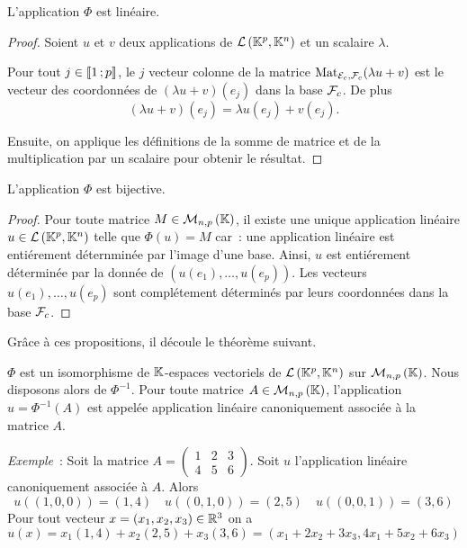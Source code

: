 \begin{prop}
  L'application \(\Phi\) est linéaire.
\end{prop}
\begin{proof}
  Soient \(u\) et \(v\) deux applications de \(\mathcal{L}\left(\mathbb{K}^p,\mathbb{K}^n\right)\) et un scalaire
  \(\lambda\).

  Pour tout \(j \in \mathopen{\llbracket}1\mathclose{}\mathpunct{};p\mathclose{\rrbracket}\), le \(j\)\ieme{} vecteur colonne
  de la matrice \(\mathrm{Mat}_{\mathcal{E}_c,\mathcal{F}_c}(\lambda u+v)\) est le vecteur des coordonnées
  de \((\lambda u+v)(e_j)\) dans la base \(\mathcal{F}_c\). De plus
  \begin{equation}
    (\lambda u+v)(e_j) = \lambda u(e_j) +v(e_j).
  \end{equation}

  Ensuite, on applique les définitions de la somme de matrice et de la
  multiplication par un scalaire pour obtenir le résultat.
\end{proof}

\begin{prop}
  L'application \(\Phi\) est bijective.
\end{prop}
\begin{proof}
  Pour toute matrice \(M \in \mathcal{M}_{n,p}\left(\mathbb{K}\right)\), il existe une unique application
  linéaire \(u \in \mathcal{L}\left(\mathbb{K}^p,\mathbb{K}^n\right)\) telle que \(\Phi(u)=M\) car~: une
  application linéaire est entiérement déternminée par l'image d'une base.
  Ainsi, \(u\) est entiérement déterminée par la donnée de \((u(e_1), \ldots,
  u(e_p))\). Les vecteurs \(u(e_1), \ldots, u(e_p)\) sont complétement
  déterminés par leurs coordonnées dans la base \(\mathcal{F}_c\).
\end{proof}

Grâce à ces propositions, il découle le théorème suivant.
\begin{theo}
  \(\Phi\) est un isomorphisme de \(\mathbb{K}\)-espaces vectoriels de
  \(\mathcal{L}\left(\mathbb{K}^p,\mathbb{K}^n\right)\) sur \(\mathcal{M}_{n,p}\left(\mathbb{K}\right)\). Nous disposons alors de
  \(\Phi^{-1}\). Pour toute matrice \(A \in \mathcal{M}_{n,p}\left(\mathbb{K}\right)\), l'application
  \(u=\Phi^{-1}(A)\) est appelée application linéaire canoniquement associée à
  la matrice \(A\).
\end{theo}

\emph{Exemple}~: Soit la matrice \(A=\begin{pmatrix} 1 & 2 & 3 \\ 4 & 5 & 6
\end{pmatrix}\). Soit \(u\) l'application linéaire canoniquement associée à
\(A\). Alors
\begin{equation}
  u((1,0,0))=(1,4) \quad u((0,1,0))=(2,5) \quad u((0,0,1))=(3,6)
\end{equation}
Pour tout vecteur \(x=(x_1,x_2,x_3) \in \mathbb{R}^3\) on a
\begin{equation}
  u(x)=x_1(1,4) + x_2(2,5) +x_3(3,6)=(x_1+2x_2+3x_3, 4x_1+5x_2+6x_3)
\end{equation}

